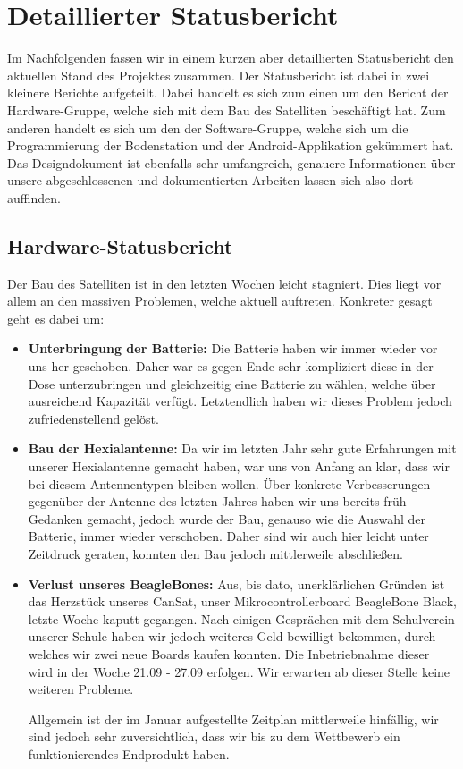 \section{Detaillierter Statusbericht}
Im Nachfolgenden fassen wir in einem kurzen aber detaillierten Statusbericht den aktuellen Stand des Projektes zusammen. Der Statusbericht ist dabei in zwei kleinere Berichte aufgeteilt. Dabei handelt es sich zum einen um den Bericht der Hardware-Gruppe, welche sich mit dem Bau des Satelliten beschäftigt hat. Zum anderen handelt es sich um den der Software-Gruppe, welche sich um die Programmierung der Bodenstation und der Android-Applikation gekümmert hat. Das Designdokument ist ebenfalls sehr umfangreich, genauere Informationen über unsere abgeschlossenen und dokumentierten Arbeiten lassen sich also dort auffinden.

\subsection{Hardware-Statusbericht}
Der Bau des Satelliten ist in den letzten Wochen leicht stagniert. Dies liegt vor allem an den massiven Problemen, welche aktuell auftreten. Konkreter gesagt geht es dabei um:

\begin{itemize}
\item \textbf{Unterbringung der Batterie:} Die Batterie haben wir immer wieder vor uns her geschoben. Daher war es gegen Ende sehr kompliziert diese in der Dose unterzubringen und gleichzeitig eine Batterie zu wählen, welche über ausreichend Kapazität verfügt. Letztendlich haben wir dieses Problem jedoch zufriedenstellend gelöst.
\item \textbf{Bau der Hexialantenne:} Da wir im letzten Jahr sehr gute Erfahrungen mit unserer Hexialantenne gemacht haben, war uns von Anfang an klar, dass wir bei diesem Antennentypen bleiben wollen. Über konkrete Verbesserungen gegenüber der Antenne des letzten Jahres haben wir uns bereits früh Gedanken gemacht, jedoch wurde der Bau, genauso wie die Auswahl der Batterie, immer wieder verschoben. Daher sind wir auch hier leicht unter Zeitdruck geraten, konnten den Bau jedoch mittlerweile abschließen.
\item \textbf{Verlust unseres BeagleBones:} Aus, bis dato, unerklärlichen Gründen ist das Herzstück unseres CanSat, unser Mikrocontrollerboard BeagleBone Black, letzte Woche kaputt gegangen. Nach einigen Gesprächen mit dem Schulverein unserer Schule haben wir jedoch weiteres Geld bewilligt bekommen, durch welches wir zwei neue Boards kaufen konnten. Die Inbetriebnahme dieser wird in der Woche 21.09 - 27.09 erfolgen. Wir erwarten ab dieser Stelle keine weiteren Probleme.

Allgemein ist der im Januar aufgestellte Zeitplan mittlerweile hinfällig, wir sind jedoch sehr zuversichtlich, dass wir bis zu dem Wettbewerb ein funktionierendes Endprodukt haben.

\end{itemize}
